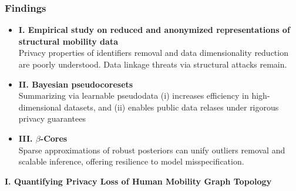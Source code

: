 \documentclass[hyperref={colorlinks = true},unknownkeysallowed]{beamer}
\begin{document}
\begin{frame}
	\frametitle{Findings}
	\begin{itemize}
		\item \textbf{I. Empirical study on reduced and anonymized representations of structural mobility data} \\
		Privacy properties of identifiers removal and data dimensionality reduction are poorly understood. Data linkage threats via structural attacks remain.
		\pause
		\item \textbf{II. Bayesian pseudocoresets} \\
		Summarizing via learnable pseudodata (i) increases efficiency in high-dimensional datasets, and (ii) enables public data relases under rigorous privacy guarantees
		\pause
		\item \textbf{III. $\beta$-Cores} \\
		Sparse approximations of robust posteriors can unify outliers removal and scalable inference, offering resilience to model misspecification.
	\end{itemize}
\end{frame}


\begin{frame}
	\LARGE{\textbf{I. Quantifying Privacy Loss of Human Mobility Graph Topology}}
\end{frame}
\end{document}
